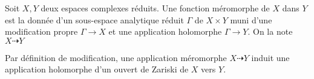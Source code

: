 \documentclass[a4page,10pt]{article}
\begin{document}
\begin{Def}
Soit $X,Y$ deux espaces complexes r\'eduits. Une fonction m\'eromorphe de $X$ dans $Y$ est la donn\'ee d'un sous-espace analytique r\'eduit $\Gamma$ de $X \times Y$ muni d'une modification propre $\Gamma \to X$ et une application holomorphe $\Gamma \to Y$. On la note $X \dashrightarrow Y$
\end{Def}
Par d\'efinition de modification, une application m\'eromorphe $ X \dashrightarrow Y$ induit une application holomorphe d'un ouvert de Zariski de $X$ vers $Y$.
%
%
\end{document}
